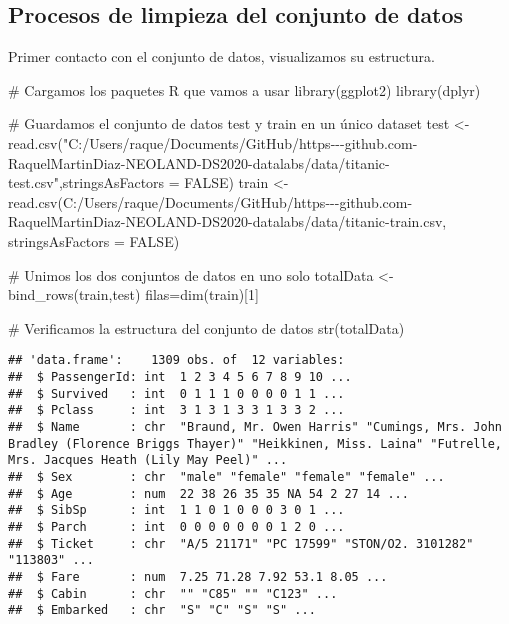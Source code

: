 \documentclass[]{article}
\newenvironment{Shaded}{\begin{snugshade}}{\end{snugshade}}
\newcommand{\CommentTok}[1]{\textcolor[rgb]{0.50,0.62,0.50}{#1}}
\newcommand{\DataTypeTok}[1]{\textcolor[rgb]{0.87,0.87,0.75}{#1}}
\newcommand{\DecValTok}[1]{\textcolor[rgb]{0.86,0.86,0.80}{#1}}
\newcommand{\KeywordTok}[1]{\textcolor[rgb]{0.94,0.87,0.69}{#1}}
\newcommand{\NormalTok}[1]{\textcolor[rgb]{0.80,0.80,0.80}{#1}}
\newcommand{\OtherTok}[1]{\textcolor[rgb]{0.94,0.94,0.56}{#1}}
\newcommand{\StringTok}[1]{\textcolor[rgb]{0.80,0.58,0.58}{#1}}
\begin{document}
\hypertarget{procesos-de-limpieza-del-conjunto-de-datos}{%
\subsection{Procesos de limpieza del conjunto de
datos}\label{procesos-de-limpieza-del-conjunto-de-datos}}

Primer contacto con el conjunto de datos, visualizamos su estructura.

\begin{Shaded}
\begin{Highlighting}[]
\CommentTok{\# Cargamos los paquetes R que vamos a usar}
\KeywordTok{library}\NormalTok{(ggplot2)}
\KeywordTok{library}\NormalTok{(dplyr)}

\CommentTok{\# Guardamos el conjunto de datos test y train en un único dataset}
\NormalTok{test \textless{}{-}}\StringTok{ }\KeywordTok{read.csv}\NormalTok{(}\StringTok{"C:/Users/raque/Documents/GitHub/https{-}{-}{-}github.com{-}RaquelMartinDiaz{-}NEOLAND{-}DS2020{-}datalabs/data/titanic{-}test.csv"}\NormalTok{,}\DataTypeTok{stringsAsFactors =} \OtherTok{FALSE}\NormalTok{)}
\NormalTok{train \textless{}{-}}\StringTok{ }\KeywordTok{read.csv}\NormalTok{(}\StringTok{\textquotesingle{}C:/Users/raque/Documents/GitHub/https{-}{-}{-}github.com{-}RaquelMartinDiaz{-}NEOLAND{-}DS2020{-}datalabs/data/titanic{-}train.csv\textquotesingle{}}\NormalTok{, }\DataTypeTok{stringsAsFactors =} \OtherTok{FALSE}\NormalTok{)}

\CommentTok{\# Unimos los dos conjuntos de datos en uno solo}
\NormalTok{totalData \textless{}{-}}\StringTok{ }\KeywordTok{bind\_rows}\NormalTok{(train,test)}
\NormalTok{filas=}\KeywordTok{dim}\NormalTok{(train)[}\DecValTok{1}\NormalTok{]}

\CommentTok{\# Verificamos la estructura del conjunto de datos}
\KeywordTok{str}\NormalTok{(totalData)}
\end{Highlighting}
\end{Shaded}

\begin{verbatim}
## 'data.frame':    1309 obs. of  12 variables:
##  $ PassengerId: int  1 2 3 4 5 6 7 8 9 10 ...
##  $ Survived   : int  0 1 1 1 0 0 0 0 1 1 ...
##  $ Pclass     : int  3 1 3 1 3 3 1 3 3 2 ...
##  $ Name       : chr  "Braund, Mr. Owen Harris" "Cumings, Mrs. John Bradley (Florence Briggs Thayer)" "Heikkinen, Miss. Laina" "Futrelle, Mrs. Jacques Heath (Lily May Peel)" ...
##  $ Sex        : chr  "male" "female" "female" "female" ...
##  $ Age        : num  22 38 26 35 35 NA 54 2 27 14 ...
##  $ SibSp      : int  1 1 0 1 0 0 0 3 0 1 ...
##  $ Parch      : int  0 0 0 0 0 0 0 1 2 0 ...
##  $ Ticket     : chr  "A/5 21171" "PC 17599" "STON/O2. 3101282" "113803" ...
##  $ Fare       : num  7.25 71.28 7.92 53.1 8.05 ...
##  $ Cabin      : chr  "" "C85" "" "C123" ...
##  $ Embarked   : chr  "S" "C" "S" "S" ...
\end{verbatim}
\end{document}

